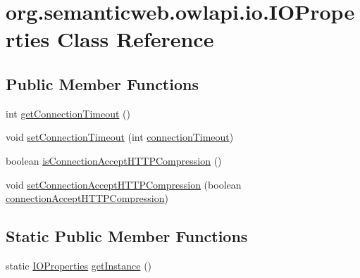 \hypertarget{classorg_1_1semanticweb_1_1owlapi_1_1io_1_1_i_o_properties}{\section{org.\-semanticweb.\-owlapi.\-io.\-I\-O\-Properties Class Reference}
\label{classorg_1_1semanticweb_1_1owlapi_1_1io_1_1_i_o_properties}
}
\subsection*{Public Member Functions}
\begin{DoxyCompactItemize}
\item 
int \hyperlink{classorg_1_1semanticweb_1_1owlapi_1_1io_1_1_i_o_properties_a4fc94a7d36babd96203528192498005b}{get\-Connection\-Timeout} ()
\item 
void \hyperlink{classorg_1_1semanticweb_1_1owlapi_1_1io_1_1_i_o_properties_a4061c53d7b7967ea22d07e8916f6e1e9}{set\-Connection\-Timeout} (int \hyperlink{classorg_1_1semanticweb_1_1owlapi_1_1io_1_1_i_o_properties_af2097004dc3dc16597aa4f232de86e06}{connection\-Timeout})
\item 
boolean \hyperlink{classorg_1_1semanticweb_1_1owlapi_1_1io_1_1_i_o_properties_a2d329bf8d4fa9de5493d33d0efead510}{is\-Connection\-Accept\-H\-T\-T\-P\-Compression} ()
\item 
void \hyperlink{classorg_1_1semanticweb_1_1owlapi_1_1io_1_1_i_o_properties_a0958c6f1e8f94ef467a03a951f3682f4}{set\-Connection\-Accept\-H\-T\-T\-P\-Compression} (boolean \hyperlink{classorg_1_1semanticweb_1_1owlapi_1_1io_1_1_i_o_properties_a3182d8cba137da367771eeb4461dd3db}{connection\-Accept\-H\-T\-T\-P\-Compression})
\end{DoxyCompactItemize}
\subsection*{Static Public Member Functions}
\begin{DoxyCompactItemize}
\item 
static \hyperlink{classorg_1_1semanticweb_1_1owlapi_1_1io_1_1_i_o_properties}{I\-O\-Properties} \hyperlink{classorg_1_1semanticweb_1_1owlapi_1_1io_1_1_i_o_properties_a52775d3b6db1e24182db7f5eadf2c1df}{get\-Instance} ()
\end{DoxyCompactItemize}
